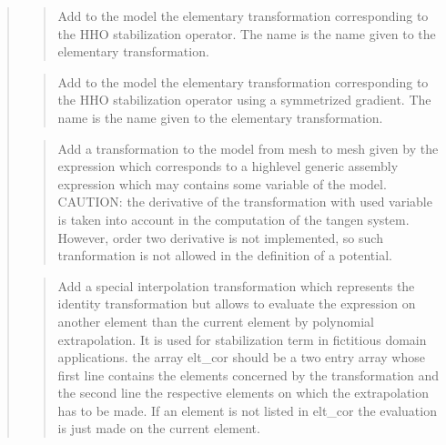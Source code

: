 \documentclass[a4paper,11pt,english]{sphinxmanual}
\begin{document}
\begin{quote}
\begin{quote}

Add to the model the elementary transformation corresponding to the
HHO stabilization operator.
The name is the name given to the elementary transformation.
\end{quote}

\begin{quote}

Add to the model the elementary transformation corresponding to the
HHO stabilization operator using a symmetrized gradient.
The name is the name given to the elementary transformation.
\end{quote}

\begin{quote}

Add a transformation to the model from mesh  to mesh
 given by the expression  which corresponds to a
high\sphinxhyphen{}level generic assembly expression which may contains some
variable of the model. CAUTION: the derivative of the
transformation with used variable is taken into account in the
computation of the tangen system. However, order two derivative is not
implemented, so such tranformation is not allowed in the definition
of a potential.
\end{quote}

\begin{quote}

Add a special interpolation transformation which represents the identity
transformation but allows to evaluate the expression on another element
than the current element by polynomial extrapolation. It is used for
stabilization term in fictitious domain applications. the array elt\_cor
should be a two entry array whose first line contains the elements
concerned by the transformation and the second line the respective
elements on which the extrapolation has to be made. If an element
is not listed in elt\_cor the evaluation is just made on the current
element.
\end{quote}


\end{quote}
\end{document}
